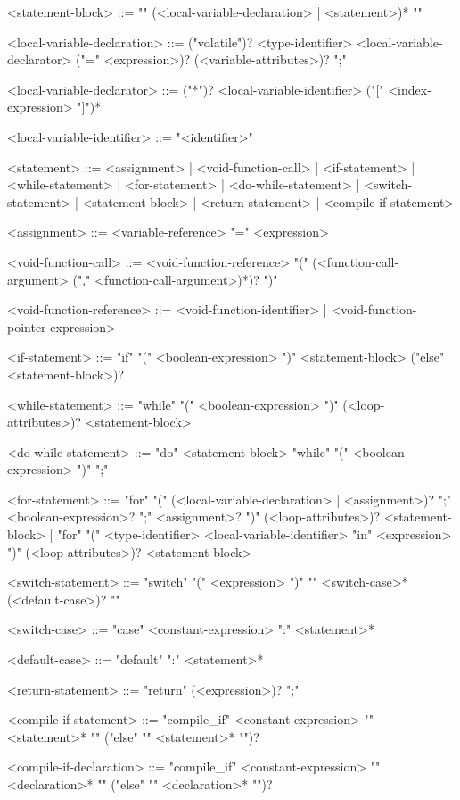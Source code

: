 \documentclass[11pt,letterpaper,twoside,openany]{book}
\begin{document}
\begin{grammar}
<statement-block> ::=
      "{" (<local-variable-declaration> | <statement>)* "}"

<local-variable-declaration> ::=
   ("volatile")? <type-identifier> <local-variable-declarator>
   ("=" <expression>)? (<variable-attributes>)? ";"

<local-variable-declarator> ::=
   ("*")? <local-variable-identifier> ("[" <index-expression> "]")*

<local-variable-identifier> ::= "<identifier>"

<statement> ::=
    <assignment> |
    <void-function-call> |
    <if-statement> |
    <while-statement> |
    <for-statement> |
    <do-while-statement> |
    <switch-statement> |
    <statement-block> |
    <return-statement> |
    <compile-if-statement>

<assignment> ::= <variable-reference> "=" <expression>

<void-function-call> ::= <void-function-reference>  "(" (<function-call-argument> ("," <function-call-argument>)*)? ")"

<void-function-reference> ::=
  <void-function-identifier> |
  <void-function-pointer-expression>

<if-statement> ::= "if" "(" <boolean-expression> ")" <statement-block> ("else" <statement-block>)?

<while-statement> ::= "while" "(" <boolean-expression> ")" (<loop-attributes>)? <statement-block>

<do-while-statement> ::= "do" <statement-block> "while" "(" <boolean-expression> ")" ";"

<for-statement> ::=
   "for" "(" (<local-variable-declaration> | <assignment>)? ";"
   <boolean-expression>? ";"
   <assignment>? ")" (<loop-attributes>)? <statement-block> |
   "for" "(" <type-identifier> <local-variable-identifier> "in" <expression> ")"
   (<loop-attributes>)? <statement-block>

<switch-statement> ::=
   "switch" "(" <expression> ")" "{"
   <switch-case>*
   (<default-case>)?
   "}"

<switch-case> ::= "case" <constant-expression> ":" <statement>*

<default-case> ::= "default" ":" <statement>*

<return-statement> ::= "return" (<expression>)? ";"

<compile-if-statement> ::=
   "compile_if" <constant-expression> "{"
      <statement>*
   "}" ("else" "{" <statement>* "}")?

<compile-if-declaration> ::=
   "compile_if" <constant-expression> "{"
      <declaration>*
   "}" ("else" "{" <declaration>* "}")?


\end{grammar}
\end{document}
